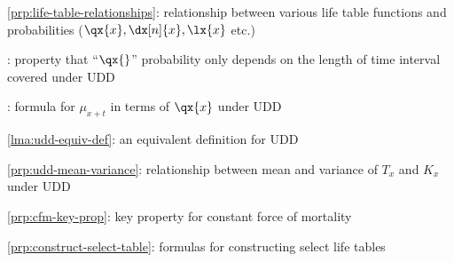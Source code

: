 \item \cref{prp:life-table-relationships}: relationship between various life table functions and probabilities (\(\qx{x},\dx[n]{x},\lx{x}\) etc.)
\item {}: property that ``\(\qx{}\)'' probability only
depends on the length of time interval covered under UDD
\item {}: formula for \(\mu_{x+t}\) in terms of
\(\qx{x}\) under UDD
\item \cref{lma:udd-equiv-def}: an equivalent definition for UDD
\item \cref{prp:udd-mean-variance}: relationship between mean and variance of \(T_x\) and \(K_x\) under UDD
\item \cref{prp:cfm-key-prop}: key property for constant force of mortality
\item \cref{prp:construct-select-table}: formulas for constructing select life tables
